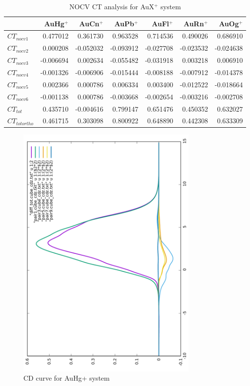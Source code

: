 \documentclass[journal=inoraj,manuscript=article]{achemso}
\begin{document}
\begin{table}[!h]
\begin{tabular}{lrrrrrr}
\hline
                 & AuHg$^+$  & AuCn$^+$  & AuPb$^+$  & AuFl$^+$  & AuRn$^+$  & AuOg$^+$ \\ \hline
\hline
$CT_{nocv1}$     &  0.477012 &  0.361730 &  0.963528 &  0.714536 &  0.490026 &  0.686910 \\ \hline
$CT_{nocv2}$     &  0.000208 & -0.052032 & -0.093912 & -0.027708 & -0.023532 & -0.024638 \\ \hline
$CT_{nocv3}$     & -0.006694 &  0.002634 & -0.055482 & -0.031918 &  0.003218 &  0.006910 \\ \hline
$CT_{nocv4}$     & -0.001326 & -0.006906 & -0.015444 & -0.008188 & -0.007912 & -0.014378 \\ \hline
$CT_{nocv5}$     &  0.002366 &  0.000786 &  0.006334 &  0.003400 & -0.012522 & -0.018664 \\ \hline
$CT_{nocv6}$     & -0.001138 &  0.000786 & -0.003668 & -0.002654 & -0.003216 & -0.002708 \\ \hline
$CT_{tot}$       &  0.435710 & -0.004616 &  0.799147 &  0.651476 &  0.450352 &  0.632027 \\ \hline
$CT_{tot ortho}$ &  0.461715 &  0.303098 &  0.800922 &  0.648890 &  0.442308 &  0.633309 \\ \hline
\end{tabular}
\caption{NOCV CT analysis for AuX$^+$ system}
\end{table}



\begin{figure}[!h]
\includegraphics[angle=-90,width=0.80\textwidth]{./AuHg+/cd.pdf}
\caption{CD curve for AuHg+ system}
\end{figure}
\end{document}
